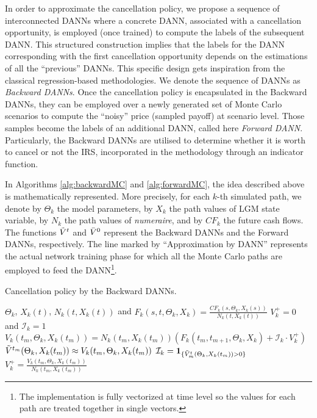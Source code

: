         In order to approximate the cancellation policy, we propose a sequence of interconnected DANNs where a concrete DANN, associated with a cancellation opportunity, is employed (once trained) to compute the labels of the subsequent DANN. This structured construction implies that the labels for the DANN corresponding with the first cancellation opportunity depends on the estimations of all the ``previous'' DANNs. This specific design gets inspiration from the classical regression-based methodologies. We denote the sequence of DANNs as \emph{Backward DANNs}. Once the cancellation policy is encapsulated in the Backward DANNs, they can be employed over a newly generated set of Monte Carlo scenarios to compute the ``noisy'' price (sampled payoff) at scenario level. Those samples become the labels of an additional DANN, called here \emph{Forward DANN}. Particularly, the Backward DANNs are utilised to determine whether it is worth to cancel or not the IRS, incorporated in the methodology through an indicator function.
        
        In Algorithms \ref{alg:backwardMC} and \ref{alg:forwardMC}, the idea described above is mathematically represented. More precisely, for each $k$-th simulated path, we denote by $\Theta_k$ the model parameters, by $X_k$ the path values of LGM state variable, by $N_k$ the path values of \emph{numeraire}, and by $CF_k$ the future cash flows. The functions $\Tilde{V}^t$ and $\Bar{V}^0$ represent the Backward DANNs and the Forward DANNs, respectively. The line marked by ``Approximation by DANN'' represents the actual network training phase for which all the Monte Carlo paths are employed to feed the DANN\footnote{The implementation is fully vectorized at time level so the values for each path are treated together in single vectors.}.
        \begin{algorithm}
        \caption{Cancellation policy by the Backward DANNs.}\label{alg:backwardMC}
            \begin{algorithmic}
            \Require $\Theta_k$, $X_k(t)$, $N_k(t, X_k(t))$ and $F_k(s, t, \Theta_k, X_k) = \frac{CF_k(s, \Theta_k, X_k(s))}{N_k(t, X_k(t))}$
            \Ensure $V_k^+ = 0$ and $\mathcal{I}_k = 1$
                \State $V_k(t_m, \Theta_k, X_k(t_m)) = N_k(t_m, X_k(t_m))\left(F_k(t_m, t_{m + 1}, \Theta_k, X_k) + \mathcal{I}_k\cdot V_k^+\right)$
                \State $\Tilde{V}^{t_m}(\Theta_k, X_k(t_m)) \approx V_k(t_m, \Theta_k, X_k(t_m))$ 
                \State $\mathcal{I}_k = \mathbf{1}_{\{\Tilde{V}^t_m(\Theta_k, X_k(t_m))>0\}}$ 
                \State $V_k^+ = \frac{V_k(t_m, \Theta_k, X_k(t_m))}{N_k(t_m, X_k(t_m))}$ 
            \EndFor
        \end{algorithmic}
        \end{algorithm}
        
